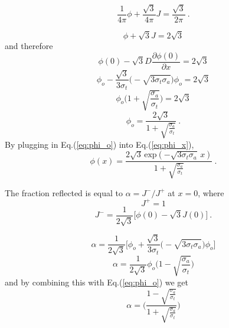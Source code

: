 \documentclass{article}
\begin{document}
\begin{equation*}
 \frac{1}{4\pi} \phi + \frac{\sqrt{3}}{4\pi} J = \frac{\sqrt{3}}{2\pi} \: .
\end{equation*}

\begin{equation*}
\phi + \sqrt{3} J = 2 \sqrt{3} 
\end{equation*}
and therefore
\begin{equation*}
\phi(0) - \sqrt{3} D \frac{\partial \phi(0)}{\partial x} = 2 \sqrt{3} 
\end{equation*}
\begin{equation*}
\phi_o - \frac{\sqrt{3}}{3\sigma_t} \big( - \sqrt{3 \sigma_t \sigma_a} \big) \phi_o = 2 \sqrt{3} 
\end{equation*}
\begin{equation*}
\phi_o \Big( 1 + \sqrt{\frac{\sigma_a}{\sigma_t}} \Big) = 2 \sqrt{3} 
\end{equation*}
\begin{equation}
\label{eq:phi_o}
\phi_o  =  \frac{2 \sqrt{3}}{1 + \sqrt{\frac{\sigma_a}{\sigma_t}}} \: .
\end{equation}
By plugging in Eq.(\ref{eq:phi_o}) into Eq.(\ref{eq:phi_x}),
\begin{equation*}
\phi (x)  =  \frac{2 \sqrt{3}\, \text{exp}(- \sqrt{3\sigma_t \sigma_a} \, x)}{1 + \sqrt{\frac{\sigma_a}{\sigma_t}}} \: . 
\end{equation*}

\vspace{0.5cm}

The fraction reflected is equal to $\alpha = J^- / J^+$ at $x=0$, where
\begin{equation*}
J^+ = 1 
\end{equation*} 
\begin{equation*}
J^- = \frac{1}{2\sqrt{3}} \big[\phi(0) - \sqrt{3}J(0) \big] \: .
\end{equation*}

\begin{equation*}
\alpha = \frac{1}{2\sqrt{3}} \Big[\phi_o + \frac{\sqrt{3}}{3\sigma_t}  \big( - \sqrt{3 \sigma_t \sigma_a} \big) \phi_o \Big]
\end{equation*}
\begin{equation*}
\alpha = \frac{1}{2\sqrt{3}} \phi_o \Big( 1- \sqrt{\frac{\sigma_a}{\sigma_t}} \Big)
\end{equation*}
and by combining this with Eq.(\ref{eq:phi_o}) we get
\begin{equation*}
\boxed{ \alpha = \Bigg( \frac{1 - \sqrt{\frac{\sigma_a}{\sigma_t}}}{1 + \sqrt{\frac{\sigma_a}{\sigma_t}}} \Bigg) }
\end{equation*}
\end{document}
